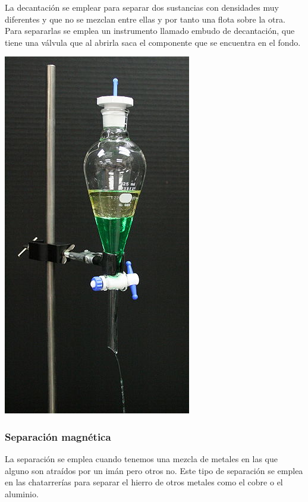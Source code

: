 La decantación se emplear para separar dos sustancias con densidades muy diferentes y que no se mezclan entre ellas y por tanto una flota sobre la otra. Para separarlas se emplea un instrumento llamado embudo de decantación, que tiene una válvula que al abrirla saca el componente que se encuentra en el fondo.
\begin{center}
\includegraphics[scale=0.5]{imagenes/decantacion} 
\end{center}


\subsubsection*{Separación magnética}

La separación se emplea cuando tenemos una mezcla de metales en las que alguno son atraídos por un imán pero otros no. Este tipo de separación se emplea en las chatarrerías para separar el hierro de otros metales como el cobre o el aluminio.

